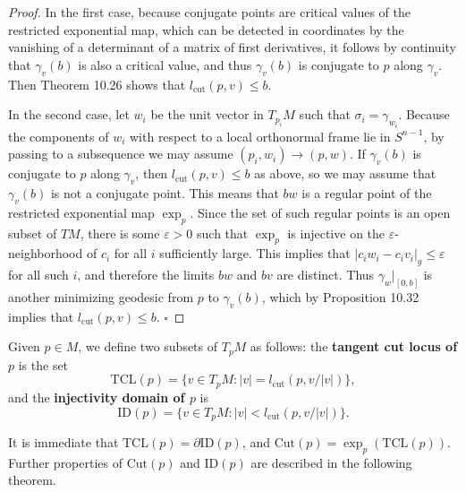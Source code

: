 \begin{theorem}
\begin{proof}
In the first case, because conjugate points are critical values of the restricted exponential map, which can be detected in coordinates by the vanishing of a determinant of a matrix of first derivatives, it follows by continuity that $\gamma_v(b)$ is also a critical value, and thus $\gamma_v(b)$ is conjugate to $p$ along $\gamma_v$. Then Theorem 10.26 shows that $l_{\text{cut}}(p,v) \leq b$.

In the second case, let $w_i$ be the unit vector in $T_{p_i} M$ such that $\sigma_i = \gamma_{w_i}$. Because the components of $w_i$ with respect to a local orthonormal frame lie in $S^{n-1}$, by passing to a subsequence we may assume $(p_i, w_i) \to (p, w)$. If $\gamma_v(b)$ is conjugate to $p$ along $\gamma_v$, then $l_{\text{cut}}(p,v) \leq b$ as above, so we may assume that $\gamma_v(b)$ is not a conjugate point. This means that $bw$ is a regular point of the restricted exponential map $\exp_p$. Since the set of such regular points is an open subset of $TM$, there is some $\varepsilon > 0$ such that $\exp_p$ is injective on the $\varepsilon$-neighborhood of $c_i$ for all $i$ sufficiently large. This implies that $|c_i w_i - c_i v_i|_g \leq \varepsilon$ for all such $i$, and therefore the limits $bw$ and $bv$ are distinct. Thus $\gamma_w|_{[0,b]}$ is another minimizing geodesic from $p$ to $\gamma_v(b)$, which by Proposition 10.32 implies that $l_{\text{cut}}(p,v) \leq b$. $\square$
\end{proof}
\end{theorem}

Given $p \in M$, we define two subsets of $T_p M$ as follows: the \textbf{tangent cut locus of $p$} is the set
\[
\text{TCL}(p) = \{v \in T_p M : |v| = l_{\text{cut}}(p, v/|v|)\},
\]
and the \textbf{injectivity domain of $p$} is
\[
\text{ID}(p) = \{v \in T_p M : |v| < l_{\text{cut}}(p, v/|v|)\}.
\]

It is immediate that $\text{TCL}(p) = \partial \text{ID}(p)$, and $\text{Cut}(p) = \exp_p(\text{TCL}(p))$. Further properties of $\text{Cut}(p)$ and $\text{ID}(p)$ are described in the following theorem.


